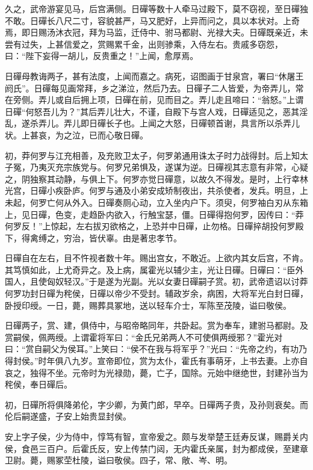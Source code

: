\documentclass[]{article}
\begin{document}
久之，武帝游宴见马，后宫满侧。日磾等数十人牵马过殿下，莫不窃视，至日磾独不敢。日磾长八尺二寸，容貌甚严，马又肥好，上异而问之，具以本状对。上奇焉，即日赐汤沐衣冠，拜为马监，迁侍中、驸马都尉、光禄大夫。日磾既亲近，未尝有过失，上甚信爱之，赏赐累千金，出则骖乘，入侍左右。贵戚多窃怨，曰：``陛下妄得一胡儿，反贵重之！''上闻，愈厚焉。

日磾母教诲两子，甚有法度，上闻而嘉之。病死，诏图画于甘泉宫，署曰``休屠王阏氏''。日磾每见画常拜，乡之涕泣，然后乃去。日磾子二人皆爱，为帝弄儿，常在旁侧。弄儿或自后拥上项，日磾在前，见而目之。弄儿走且啼曰：``翁怒。''上谓日磾``何怒吾儿为？''其后弄儿壮大，不谨，自殿下与宫人戏，日磾适见之，恶其淫乱，遂杀弄儿。弄儿即日磾长子也。上闻之大怒，日磾顿首谢，具言所以杀弄儿状。上甚哀，为之泣，已而心敬日磾。

初，莽何罗与江充相善，及充败卫太子，何罗弟通用诛太子时力战得封。后上知太子冤，乃夷灭充宗族党与。何罗兄弟惧及，遂谋为逆。日磾视其志意有非常，心疑之，阴独察其动静，与俱上下。何罗亦觉日磾意，以故久不得发。是时，上行幸林光宫，日磾小疾卧庐。何罗与通及小弟安成矫制夜出，共杀使者，发兵。明旦，上未起，何罗亡何从外入。日磾奏厕心动，立入坐内户下。须臾，何罗袖白刃从东箱上，见日磾，色变，走趋卧内欲入，行触宝瑟，僵。日磾得抱何罗，因传曰：``莽何罗反！''上惊起，左右拔刃欲格之，上恐并中日磾，止勿格。日磾捽胡投何罗殿下，得禽缚之，穷治，皆伏辜。由是著忠孝节。

日磾自在左右，目不忤视者数十年。赐出宫女，不敢近。上欲内其女后宫，不肯。其笃慎如此，上尤奇异之。及上病，属霍光以辅少主，光让日磾。日磾曰：``臣外国人，且使匈奴轻汉。''于是遂为光副。光以女妻日磾嗣子赏。初，武帝遗诏以讨莽何罗功封日磾为秺侯，日磾以帝少不受封。辅政岁余，病困，大将军光白封日磾，卧授印绶。一日，薨，赐葬具冢地，送以轻车介士，军陈至茂陵，谥曰敬侯。

日磾两子，赏、建，俱侍中，与昭帝略同年，共卧起。赏为奉车，建驸马都尉。及赏嗣侯，佩两绶。上谓霍将军曰：``金氏兄弟两人不可使俱两绶邪？''霍光对曰：``赏自嗣父为侯耳。''上笑曰：``侯不在我与将军乎？''光曰：``先帝之约，有功乃得封侯。''时年俱八九岁。宣帝即位，赏为太仆，霍氏有事萌牙，上书去妻。上亦自哀之，独得不坐。元帝时为光禄勋，薨，亡子，国除。元始中继绝世，封建孙当为秺侯，奉日磾后。

初，日磾所将俱降弟伦，字少卿，为黄门郎，早卒。日磾两子贵，及孙则衰矣。而伦后嗣遂盛，子安上始贵显封侯。

安上字子侯，少为侍中，惇笃有智，宣帝爰之。颇与发举楚王廷寿反谋，赐爵关内侯，食邑三百户。后霍氏反，安上传禁门闼，无内霍氏亲属，封为都成侯，至建章卫尉。薨，赐冢茔杜陵，谥曰敬侯。四子，常、敞、岑、明。
\end{document}
